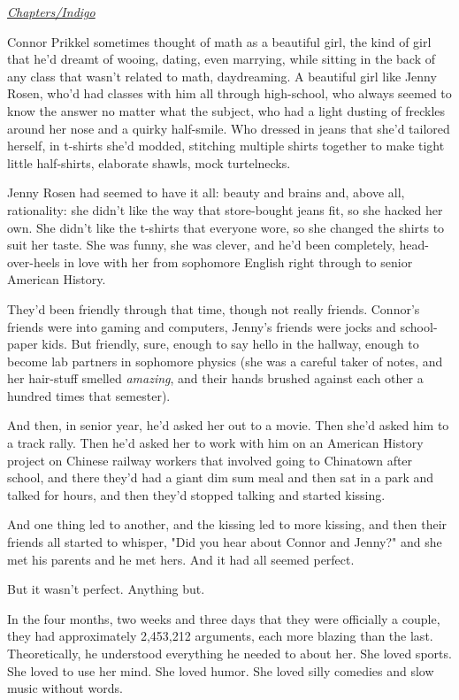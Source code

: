 \emph{\href{http://www.chapters.indigo.ca/books/For-The-Win-Cory-Doctorow/9780765322166-item.html}{Chapters/Indigo}}

Connor Prikkel sometimes thought of math as a beautiful girl, the
kind of girl that he'd dreamt of wooing, dating, even marrying,
while sitting in the back of any class that wasn't related to math,
daydreaming. A beautiful girl like Jenny Rosen, who'd had classes
with him all through high-school, who always seemed to know the
answer no matter what the subject, who had a light dusting of
freckles around her nose and a quirky half-smile. Who dressed in
jeans that she'd tailored herself, in t-shirts she'd modded,
stitching multiple shirts together to make tight little
half-shirts, elaborate shawls, mock turtelnecks.

Jenny Rosen had seemed to have it all: beauty and brains and, above
all, rationality: she didn't like the way that store-bought jeans
fit, so she hacked her own. She didn't like the t-shirts that
everyone wore, so she changed the shirts to suit her taste. She was
funny, she was clever, and he'd been completely, head-over-heels in
love with her from sophomore English right through to senior
American History.

They'd been friendly through that time, though not really friends.
Connor's friends were into gaming and computers, Jenny's friends
were jocks and school-paper kids. But friendly, sure, enough to say
hello in the hallway, enough to become lab partners in sophomore
physics (she was a careful taker of notes, and her hair-stuff
smelled \emph{amazing}, and their hands brushed against each other
a hundred times that semester).

And then, in senior year, he'd asked her out to a movie. Then she'd
asked him to a track rally. Then he'd asked her to work with him on
an American History project on Chinese railway workers that
involved going to Chinatown after school, and there they'd had a
giant dim sum meal and then sat in a park and talked for hours, and
then they'd stopped talking and started kissing.

And one thing led to another, and the kissing led to more kissing,
and then their friends all started to whisper, "Did you hear about
Connor and Jenny?" and she met his parents and he met hers. And it
had all seemed perfect.

But it wasn't perfect. Anything but.

In the four months, two weeks and three days that they were
officially a couple, they had approximately 2,453,212 arguments,
each more blazing than the last. Theoretically, he understood
everything he needed to about her. She loved sports. She loved to
use her mind. She loved humor. She loved silly comedies and slow
music without words.

